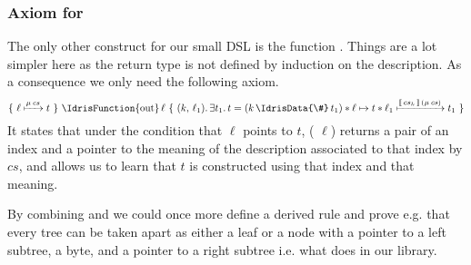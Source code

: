 \subsubsection{Axiom for }

The only other construct for our small DSL is the function .
Things are a lot simpler here as the return type
is not defined by induction on the description.
As a consequence we only need the following axiom.
\[
\Hoare
    {\Pointer{\ell}{\Mu{cs}}{t}}
    {\text{\IdrisFunction{out}}\,\ell}
    {(k,\, \ell_1)}
    {\exists t_1.\, t = (k \,\text{\IdrisData{\#}}\, t_1)
      \ast \Pointer{\ell}{}{t} \ast \Pointer{\ell_1}{\Meaning{cs_k}{cs}}{t_1}}
\]
It states that under the condition that $\ell$ points to $t$,
( $\ell$) returns a pair of an index
and a pointer to the meaning of the description associated to that index by $cs$,
and allows us to learn that $t$ is constructed using that index
and that meaning.

By combining  and  we could once
more define a derived rule and prove e.g. that every tree can be taken
apart as either a leaf or a node with a pointer to a left subtree, a byte,
and a pointer to a right subtree i.e. what  does in
our library.
